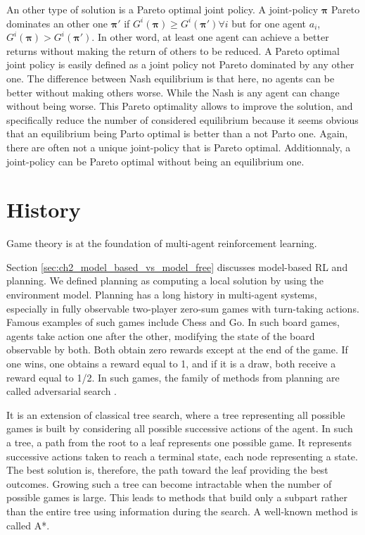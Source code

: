 An other type of solution is a Pareto optimal joint policy.
A joint-policy $\mathbf{\pi}$ Pareto dominates an other one $\mathbf{\pi'}$ if $G^i(\mathbf{\pi}) \ge G^i(\mathbf{\pi'})\forall i$ but for one agent $a_i$, $G^i(\mathbf{\pi}) > G^i(\mathbf{\pi'})$.
In other word, at least one agent can achieve a better returns without making the return of others to be reduced.
A Pareto optimal joint policy is easily defined as a joint policy not Pareto dominated by any other one.
The difference between Nash equilibrium is that here, no agents can be better without making others worse.
While the Nash is any agent can change without being worse.
This Pareto optimality allows to improve the solution, and specifically reduce the number of considered equilibrium because it seems obvious that an equilibrium being Parto optimal is better than a not Parto one.
Again, there are often not a unique joint-policy that is Pareto optimal.
Additionnaly, a joint-policy can be Pareto optimal without being an equilibrium one.




\section{History}\label{sec:ch6_history}
Game theory is at the foundation of multi-agent reinforcement learning.


Section \ref{sec:ch2_model_based_vs_model_free} discusses model-based RL and planning.
We defined planning as computing a local solution by using the environment model.
Planning has a long history in multi-agent systems, especially in fully observable two-player zero-sum games with turn-taking actions.
Famous examples of such games include Chess and Go.
In such board games, agents take action one after the other, modifying the state of the board observable by both.
Both obtain zero rewards except at the end of the game. 
If one wins, one obtains a reward equal to 1, and if it is a draw, both receive a reward equal to 1/2.
In such games, the family of methods from planning are called adversarial search \citep{russel2010}.

It is an extension of classical tree search, where a tree representing all possible games is built by considering all possible successive actions of the agent.
In such a tree, a path from the root to a leaf represents one possible game.
It represents successive actions taken to reach a terminal state, each node representing a state.
The best solution is, therefore, the path toward the leaf providing the best outcomes.
Growing such a tree can become intractable when the number of possible games is large.
This leads to methods that build only a subpart rather than the entire tree using information during the search.
A well-known method is called A*.

